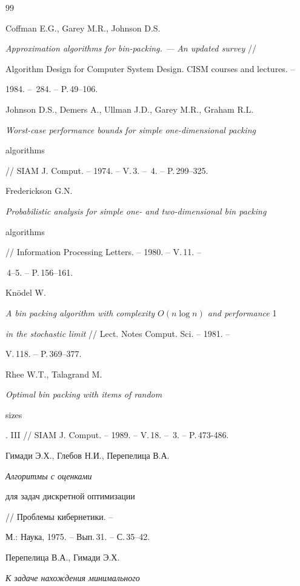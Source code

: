 \begin {thebibliography}{99}







Coffman E.G., Garey M.R., Johnson D.S.


{\em Approximation algorithms for bin-packing. --- An updated survey} //


Algorithm Design for Computer System Design. CISM courses and lectures. --


1984. -- \No\,284. -- P.\,49--106.




Johnson D.S., Demers A., Ullman J.D., Garey M.R., Graham R.L.


{\em  Worst-case performance bounds for simple one-dimensional packing


algorithms} // SIAM J. Comput. -- 1974. -- V.\,3. -- \No\,4. -- P.\,299--325.




Frederickson G.N.


{\em Probabilistic analysis for simple one- and two-dimensional bin packing


algorithms} // Information Processing Letters. -- 1980. -- V.\,11. --


\No\,4--5. -- P.\,156--161.




Kn\"{o}del W.


{\em  A bin packing algorithm with complexity $O(n\log n)$ and performance} 1


{\em in the stochastic limit} // Lect. Notes Comput. Sci. -- 1981. --


V.\,118. -- P.\,369--377.




Rhee W.T., Talagrand M. {\em Optimal bin packing with items of random


sizes}. III // SIAM J. Comput. -- 1989. -- V.\,18. -- \No\,3. -- P.\,473-486.




Гимади Э.Х., Глебов Н.И., Перепелица В.А. {\em Алгоритмы с оценками


для задач дискретной оптимизации} // Проблемы кибернетики. --


М.: Наука, 1975. -- Вып.\,31. -- С.\,35--42.




Перепелица В.А., Гимади Э.Х. {\em К задаче нахождения минимального


}
\end{thebibliography}
